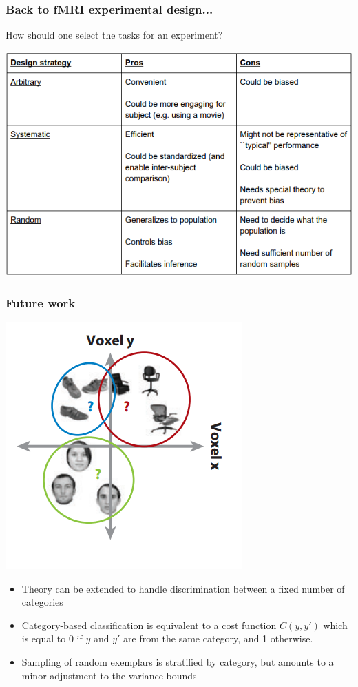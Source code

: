 \documentclass{beamer}
\begin{document}
\begin{frame}
\frametitle{Back to fMRI experimental design...}
How should one select the tasks for an experiment?
\begin{center}
\includegraphics[scale = 0.5]{procontable.png}
\end{center}
\end{frame}


\begin{frame}
\frametitle{Future work}
\begin{center}
\includegraphics[scale = 0.3]{haxby_example.png}
\end{center}
\begin{itemize}
\item Theory can be extended to handle discrimination between a fixed number of categories
\item Category-based classification is equivalent to a cost function $C(y,y')$ which is equal to 0 if $y$ and $y'$ are from the same category, and 1 otherwise.
\item Sampling of random exemplars is stratified by category, but amounts to a minor adjustment to the variance bounds
\end{itemize}
\end{frame}
\end{document}
